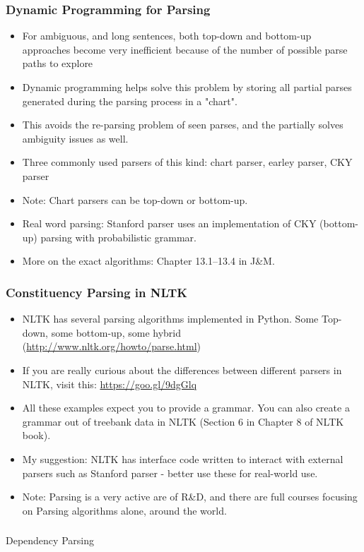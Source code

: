 \documentclass{beamer}
\begin{document}
\begin{frame}
\frametitle{Dynamic Programming for Parsing}
\begin{itemize}
\item For ambiguous, and long sentences, both top-down and bottom-up approaches become very inefficient because of the number of possible parse paths to explore
\item Dynamic programming helps solve this problem by storing all partial parses generated during the parsing process in a "chart". 
\item This avoids the re-parsing problem of seen parses, and the partially solves ambiguity issues as well.
\item Three commonly used parsers of this kind: chart parser, earley parser, CKY parser
\item Note: Chart parsers can be top-down or bottom-up. \pause
\item Real word parsing: Stanford parser uses an implementation of CKY (bottom-up) parsing with probabilistic grammar.
\item More on the exact algorithms: Chapter 13.1--13.4 in J\&M. 
\end{itemize}
\end{frame}

\begin{frame}
\frametitle{Constituency Parsing in NLTK}
\begin{itemize}
\item NLTK has several parsing algorithms implemented in Python. Some Top-down, some bottom-up, some hybrid \\ (\url{http://www.nltk.org/howto/parse.html})
 \pause
\item If you are really curious about the differences between different parsers in NLTK, visit this: \url{https://goo.gl/9dgGlq}
\item All these examples expect you to provide a grammar. You can also create a grammar out of treebank data in NLTK (Section 6 in Chapter 8 of NLTK book). 
\item My suggestion: NLTK has interface code written to interact with external parsers such as Stanford parser - better use these for real-world use.
\item Note: Parsing is a very active are of R\&D, and there are full courses focusing on Parsing algorithms alone, around the world.
\end{itemize}
\end{frame}

\begin{frame}
\frametitle{}
\Large Dependency Parsing
\end{frame}
\end{document}
